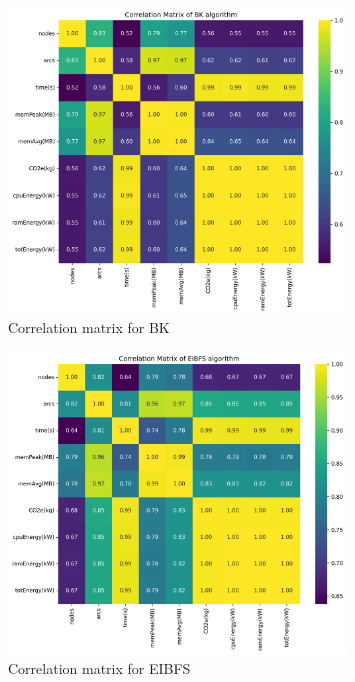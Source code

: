 \documentclass[a4paper,singleside,12pt]{report} %
\begin{document}
\begin{figure}[h!]
    \centering
    \includegraphics[width=0.8\textwidth]{imgs/bk_corr_mat.png}
    \caption{Correlation matrix for BK}
    \label{fig:bk_orr_mat}
\end{figure}

\begin{figure}[h!]
    \centering
    \includegraphics[width=0.8\textwidth]{imgs/eibfs_corr_mat.png}
    \caption{Correlation matrix for EIBFS}
    \label{fig:eibfs_corr_mat}
\end{figure}
\end{document}
